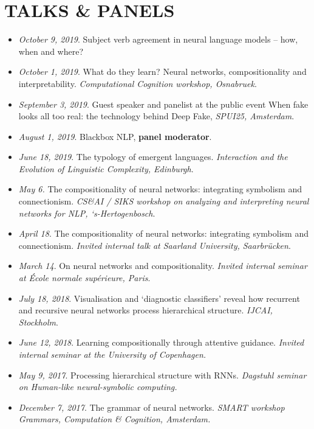 \section{TALKS \& PANELS}

\begin{itemize}
\setlength\itemsep{5pt}
    \item \textit{October 9, 2019}. Subject verb agreement in neural language models -- how, when and where?
    \item \textit{October 1, 2019}. What do they learn? Neural networks, compositionality and interpretability. \textit{Computational Cognition workshop, Osnabruek}.
    \item \textit{September 3, 2019}. Guest speaker and panelist at the public event When fake looks all too real: the technology behind Deep Fake, \textit{SPUI25, Amsterdam}.
    \item \textit{August 1, 2019}. Blackbox NLP, \textbf{panel moderator}.
    \item \textit{June 18, 2019}. The typology of emergent languages. \textit{Interaction and the Evolution of Linguistic Complexity, Edinburgh}.
    \item \textit{May 6.} The compositionality of neural networks: integrating symbolism and connectionism. \textit{CS\&AI / SIKS workshop on analyzing and interpreting neural networks for NLP, ‘s-Hertogenbosch}.
    \item \textit{April 18}. The compositionality of neural networks: integrating symbolism and connectionism. \textit{Invited internal talk at Saarland University, Saarbrücken}.
    \item \textit{March 14}. On neural networks and compositionality. \textit{Invited internal seminar at École normale supérieure, Paris}.
    \item \textit{July 18, 2018}. Visualisation and ‘diagnostic classifiers’ reveal how recurrent and recursive neural networks process hierarchical structure. \textit{IJCAI, Stockholm}.
    \item \textit{June 12, 2018}. Learning compositionally through attentive guidance. \textit{Invited internal seminar at the University of Copenhagen.}
    \item \textit{May 9, 2017}. Processing hierarchical structure with RNNs.\textit{ Dagstuhl seminar on Human-like neural-symbolic computing.}
    \item \textit{December 7, 2017}. The grammar of neural networks. \textit{SMART workshop Grammars, Computation & Cognition, Amsterdam.}

\end{itemize}
